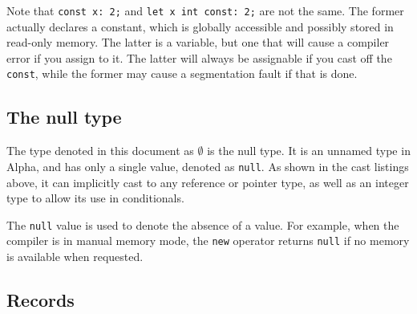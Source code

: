 \documentclass{article}
\begin{document}
Note that \texttt{const~x:~2;} and \texttt{let~x~int~const:~2;} are not the
same. The former actually declares a constant, which is globally accessible and
possibly stored in read-only memory. The latter is a variable, but one that will
cause a compiler error if you assign to it. The latter will always be assignable
if you cast off the \texttt{const}, while the former may cause a segmentation
fault if that is done.

\subsection{The null type}
\label{sub:types:null}
The type denoted in this document as $\emptyset$ is the null type. It is an
unnamed type in Alpha, and has only a single value, denoted as
\texttt{null}. As shown in the cast listings above, it can implicitly cast
to any reference or pointer type, as well as an integer type to allow its use
in conditionals.

The \texttt{null} value is used to denote the absence of a value. For example,
when the compiler is in manual memory mode, the \texttt{new} operator returns
\texttt{null} if no memory is available when requested.

\subsection{Records}
\label{sub:types:record}

\end{document}
